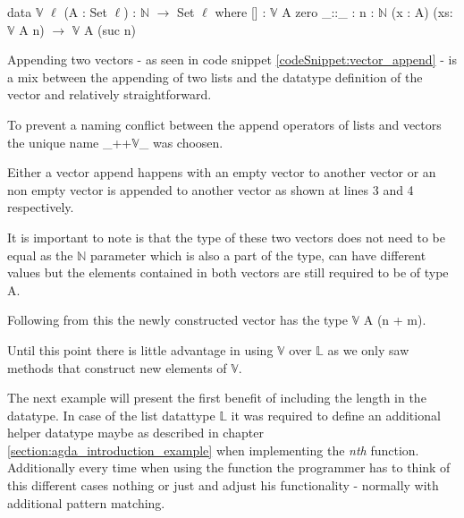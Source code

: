 \begin{codesnippet}[mathescape=true, caption={Definition of the vector datatype in Agda}, label={codeSnippet:vector_datatype}]
data $\mathbb{V}$ {$\ell$} (A : Set $\ell$) : $\mathbb{N}$ $\rightarrow$ Set $\ell$ where
  [] : $\mathbb{V}$ A zero
  _::_ : {n : $\mathbb{N}$} (x : A) (xs: $\mathbb{V}$ A n) $\rightarrow$
         $\mathbb{V}$ A (suc n)
\end{codesnippet}

Appending two vectors - as seen in code snippet \ref{codeSnippet:vector_append} - is a mix between the appending of two lists and the datatype definition of the vector and relatively straightforward.

To prevent a naming conflict between the append operators of lists and vectors the unique name \_++$\mathbb{V}$\_ was choosen.

Either a vector append happens with an empty vector to another vector or an non empty vector is appended to another vector as shown at lines 3 and 4 respectively.

It is important to note is that the type of these two vectors does not need to be equal as the $\mathbb{N}$ parameter which is also a part of the type, can have different values but the elements contained in both vectors are still required to be of type A.

Following from this the newly constructed vector has the type $\mathbb{V}$ A (n + m).
\begin{codesnippet}[mathescape=true, caption={Definition of the vector append function in Agda}, label={codeSnippet:vector_append}]
_++$\mathbb{V}$_ : $\forall$ {$\ell$} {A : Set $\ell$}  {n m: $\mathbb{N}$ $\rightarrow$
        $\mathbb{V}$ A n $\rightarrow \mathbb{V}$ A m $\rightarrow \mathbb{V}$ A (n + m)
  []        ++$\mathbb{V}$ ys = ys
  (x :: xs) ++$\mathbb{V}$ ys = x :: (xs ++$\mathbb{V}$ ys)
\end{codesnippet}

Until this point there is little advantage in using $\mathbb{V}$ over $\mathbb{L}$ as we only saw methods that construct new elements of $\mathbb{V}$.

The next example will present the first benefit of including the length in the datatype.
In case of the list datattype $\mathbb{L}$ it was required to define an additional helper datatype maybe as described in chapter \ref{section:agda_introduction_example} when implementing the \emph{nth} function.
Additionally every time when using the function the programmer has to think of this different cases nothing or just and adjust his functionality - normally with additional pattern matching.

